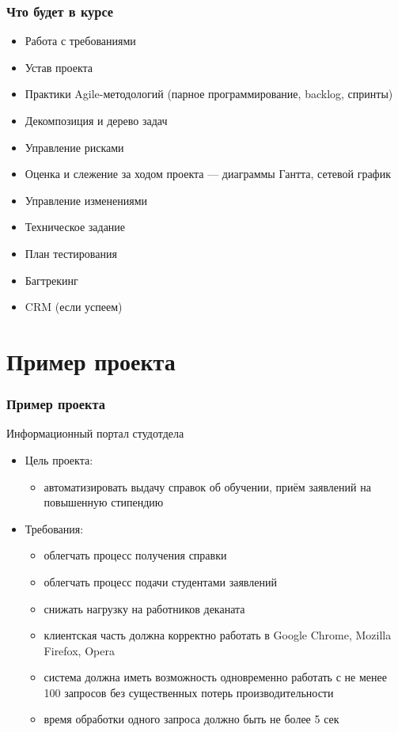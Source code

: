 \documentclass{../../slides-style}
\begin{document}
    \begin{frame}
        \frametitle{Что будет в курсе}
        \begin{footnotesize}
            \begin{itemize}
                \item Работа с требованиями
                \item Устав проекта
                \item Практики Agile-методологий (парное программирование, backlog, спринты)
                \item Декомпозиция и дерево задач
                \item Управление рисками
                \item Оценка и слежение за ходом проекта --- диаграммы Гантта, сетевой график
                \item Управление изменениями
                \item Техническое задание
                \item План тестирования
                \item Багтрекинг
                \item CRM (если успеем)
            \end{itemize}
        \end{footnotesize}
    \end{frame}

    \section{Пример проекта}

    \begin{frame}
        \frametitle{Пример проекта}
        Информационный портал студотдела
        \begin{itemize}
            \item Цель проекта:
            \begin{itemize}
                \item автоматизировать выдачу справок об обучении, приём заявлений на повышенную стипендию
            \end{itemize}
            \item Требования:
            \begin{itemize}
                \item облегчать процесс получения справки
                \item облегчать процесс подачи студентами заявлений
                \item снижать нагрузку на работников деканата
                \item клиентская часть должна корректно работать в Google Chrome, Mozilla Firefox, Opera
                \item система должна иметь возможность одновременно работать с не менее 100 запросов без существенных потерь производительности
                \item время обработки одного запроса должно быть не более 5 сек
            \end{itemize}
        \end{itemize}
    \end{frame}
\end{document}
